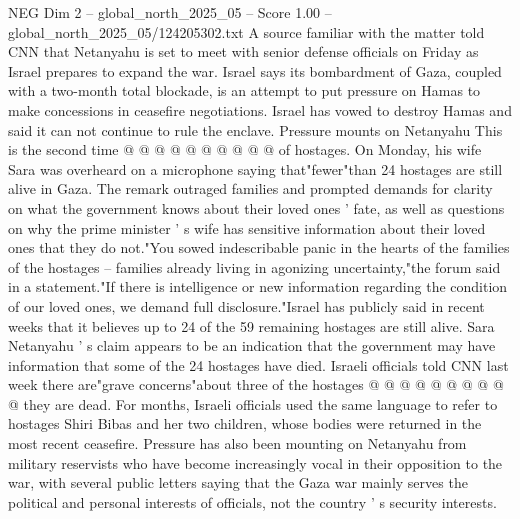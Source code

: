 \begin{textsample}{NEG Dim 2 – global\_north\_2025\_05 – Score 1.00 – global\_north\_2025\_05/124205302.txt}
A source familiar with the matter told CNN that Netanyahu is set to meet with senior defense officials on Friday as Israel prepares to expand the war.
Israel says its bombardment of Gaza, coupled with a two-month total blockade, is an attempt to put pressure on Hamas to make concessions in ceasefire negotiations.
Israel has vowed to destroy Hamas and said it can not continue to rule the enclave.
Pressure mounts on Netanyahu This is the second time @ @ @ @ @ @ @ @ @ @ of hostages.
On Monday, his wife Sara was overheard on a microphone saying that"fewer"than 24 hostages are still alive in Gaza.
The remark outraged families and prompted demands for clarity on what the government knows about their loved ones ' fate, as well as questions on why the prime minister ' s wife has sensitive information about their loved ones that they do not."You sowed indescribable panic in the hearts of the families of the hostages -- families already living in agonizing uncertainty,"the forum said in a statement."If there is intelligence or new information regarding the condition of our loved ones, we demand full disclosure."Israel has publicly said in recent weeks that it believes up to 24 of the 59 remaining hostages are still alive.
Sara Netanyahu ' s claim appears to be an indication that the government may have information that some of the 24 hostages have died.
Israeli officials told CNN last week there are"grave concerns"about three of the hostages @ @ @ @ @ @ @ @ @ @ they are dead.
For months, Israeli officials used the same language to refer to hostages Shiri Bibas and her two children, whose bodies were returned in the most recent ceasefire.
Pressure has also been mounting on Netanyahu from military reservists who have become increasingly vocal in their opposition to the war, with several public letters saying that the Gaza war mainly serves the political and personal interests of officials, not the country ' s security interests.

\end{textsample}
